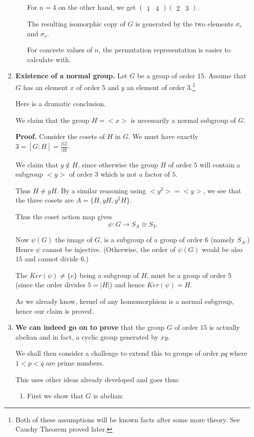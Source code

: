 \documentclass[12pt]{article}
\newcommand{\matr}[2]{\left( \begin{array}{*{#1}{r}}#2\end{array}\right)}
\begin{document}
\begin{enumerate}
\begin{itemize}
For $n=4$ on the other hand, we get $\matr{2}{1 & 4} \matr{2}{2 & 3}$.

The resulting isomorphic copy of $G$ is generated by the two elements 
$\sigma_r$ and $\sigma_s$.

For concrete values of $n$, the permutation representation is easier to
calculate with.


\end{itemize}
\item {\bf Existence of a normal group.}
Let $G$ be a group of order $15$. Assume that $G$ has an element $x$ of
order $5$ and $y$ an element of order $3$.\footnote{Both of these 
assumptions will be known facts after some more theory. 
See Cauchy Theorem proved later.}  

Here is a dramatic conclusion.  

We claim that the group
$H=<x>$ is necessarily a normal subgroup of $G$.

{\bf Proof.} Consider the cosets of $H$ in $G$. We must have exactly $3=
[G:H]=\frac{|G|}{|H|}$.

We claim that $y\not\in H$, since otherwise the group $H$ of order $5$
will contain a subgroup $<y>$ of order $3$ which is not a factor of $5$.

Thus $H \neq yH$. By a similar reasoning using $<y^2>=<y>$, we see that
the three cosets are $A=\{H,yH,y^2H\}$.

Thus the coset action map gives $$\psi:G \rightarrow S_{A}
\cong S_3.$$

Now $\psi(G)$ the image of $G$, is a subgroup of a group of order $6$ 
(namely $S_A$.) Hence $\psi$ cannot be injective. (Otherwise, the order
of $\psi(G)$ would be also $15$ and cannot divide $6$.)

The $Ker(\psi)\neq \{e\}$ being a subgroup of $H$, must be a group of order $5$
(since the order divides $5=|H|$) and hence $Ker(\psi)=H$.

As we already know, kernel of any homomorphism is a normal subgroup,
hence our claim is proved.

\item {\bf We can indeed go on to prove} that the group $G$ of order $15$ 
is actually abelian and in
fact, a cyclic group generated by $xy$. 

We shall then consider a challenge to extend this to groups 
of order $pq$ where $1<p<q$ are prime numbers.

This uses other ideas already
developed and goes thus:

\begin{enumerate}
\item First we show that $G$ is abelian:


\end{enumerate}
\end{enumerate}
\end{document}
